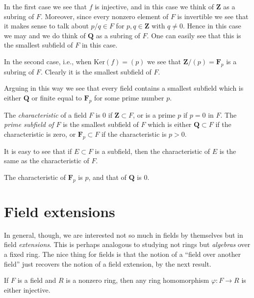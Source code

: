 \medskip\noindent
In the first case we see that $f$ is injective, and in this case
we think of $\mathbf{Z}$ as a subring of $F$. Moreover, since every
nonzero element of $F$ is invertible we see that it makes sense to
talk about $p/q \in F$ for $p, q \in \mathbf{Z}$ with $q \not = 0$.
Hence in this case we may and we do think of $\mathbf{Q}$ as a subring of $F$.
One can easily see that this is the smallest subfield of $F$ in this case.

\medskip\noindent
In the second case, i.e., when $\text{Ker}(f) = (p)$ we see that
$\mathbf{Z}/(p) = \mathbf{F}_p$ is a subring of $F$. Clearly it is the
smallest subfield of $F$.

\medskip\noindent
Arguing in this way we see that every field contains a smallest subfield
which is either $\mathbf{Q}$ or finite equal to $\mathbf{F}_p$ for some
prime number $p$.

\begin{definition}
\label{definition-characteristic}
The {\it characteristic} of a field $F$ is $0$ if
$\mathbf{Z} \subset F$, or is a prime $p$ if $p = 0$ in $F$.
The {\it prime subfield of $F$} is the smallest subfield of $F$
which is either $\mathbf{Q} \subset F$ if the characteristic is zero, or
$\mathbf{F}_p \subset F$ if the characteristic is $p > 0$.
\end{definition}

\noindent
It is easy to see that if $E \subset F$ is a subfield, then the
characteristic of $E$ is the same as the characteristic of $F$.

\begin{example}
\label{example-characteristic}
The characteristic of $\mathbf{F}_p$ is $p$, and that of $\mathbf{Q}$ is $0$.
\end{example}


\section{Field extensions}
\label{section-extensions}

\noindent
In general, though, we are interested not so much in fields by themselves but
in field {\it extensions}. This is perhaps analogous to studying not rings
but {\it algebras} over a fixed ring.
The nice thing for fields is that the notion of a ``field over another field''
just recovers the notion of a field extension, by the next result.

\begin{proposition}
\label{lemma-field-maps-injective}
If $F$ is a field and $R$ is a nonzero ring, then any ring homomorphism
$\varphi : F \to R$ is either injective.
\end{proposition}

